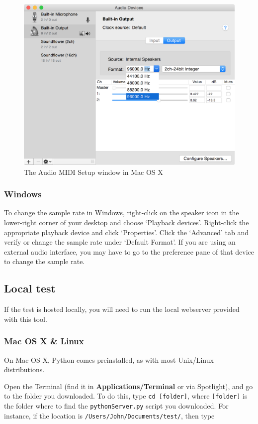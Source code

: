 \documentclass[11pt, oneside]{article}   	%
\begin{document}
			\begin{figure}[tb]
				\centering
				\includegraphics[width=.65\textwidth]{img/audiomidisetup.png}
				\caption{The Audio MIDI Setup window in Mac OS X}
				\label{fig:audiomidisetup}
			\end{figure}
		
		\subsubsection{Windows}
			To change the sample rate in Windows, right-click on the speaker icon in the lower-right corner of your desktop and choose `Playback devices'. Right-click the appropriate playback device and click `Properties'. Click the `Advanced' tab and verify or change the sample rate under `Default Format'.    %
			If you are using an external audio interface, you may have to go to the preference pane of that device to change the sample rate. 

	\subsection{Local test}
		If the test is hosted locally, you will need to run the local webserver provided with this tool. 
		
		\subsubsection{Mac OS X \& Linux}

			On Mac OS X, Python comes preinstalled, as with most Unix/Linux distributions.

			Open the Terminal (find it in \textbf{Applications/Terminal} or via Spotlight), and go to the folder you downloaded. To do this, type \texttt{cd [folder]}, where \texttt{[folder]} is the folder where to find the \texttt{pythonServer.py} script you downloaded. For instance, if the location is \texttt{/Users/John/Documents/test/}, then type
			
\end{document}
